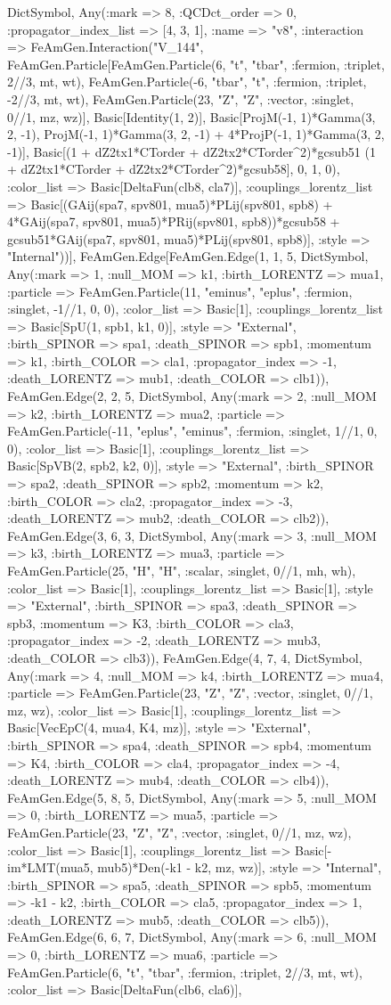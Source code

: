 \documentclass{revtex4}
\begin{document}
\begin{figure}[!htb]
\begin{center}
{Dict{Symbol, Any}(:mark => 8, :QCDct_order => 0, :propagator_index_list => [4, 3, 1], :name => "v8", :interaction => FeAmGen.Interaction("V_144", FeAmGen.Particle[FeAmGen.Particle(6, "t", "tbar", :fermion, :triplet, 2//3, mt, wt), FeAmGen.Particle(-6, "tbar", "t", :fermion, :triplet, -2//3, mt, wt), FeAmGen.Particle(23, "Z", "Z", :vector, :singlet, 0//1, mz, wz)], Basic[Identity(1, 2)], Basic[ProjM(-1, 1)*Gamma(3, 2, -1), ProjM(-1, 1)*Gamma(3, 2, -1) + 4*ProjP(-1, 1)*Gamma(3, 2, -1)], Basic[(1 + dZ2tx1*CTorder + dZ2tx2*CTorder^2)*gcsub51 (1 + dZ2tx1*CTorder + dZ2tx2*CTorder^2)*gcsub58], 0, 1, 0), :color_list => Basic[DeltaFun(clb8, cla7)], :couplings_lorentz_list => Basic[(GAij(spa7, spv801, mua5)*PLij(spv801, spb8) + 4*GAij(spa7, spv801, mua5)*PRij(spv801, spb8))*gcsub58 + gcsub51*GAij(spa7, spv801, mua5)*PLij(spv801, spb8)], :style => "Internal"))], FeAmGen.Edge[FeAmGen.Edge(1, 1, 5, Dict{Symbol, Any}(:mark => 1, :null_MOM => k1, :birth_LORENTZ => mua1, :particle => FeAmGen.Particle(11, "eminus", "eplus", :fermion, :singlet, -1//1, 0, 0), :color_list => Basic[1], :couplings_lorentz_list => Basic[SpU(1, spb1, k1, 0)], :style => "External", :birth_SPINOR => spa1, :death_SPINOR => spb1, :momentum => k1, :birth_COLOR => cla1, :propagator_index => -1, :death_LORENTZ => mub1, :death_COLOR => clb1)), FeAmGen.Edge(2, 2, 5, Dict{Symbol, Any}(:mark => 2, :null_MOM => k2, :birth_LORENTZ => mua2, :particle => FeAmGen.Particle(-11, "eplus", "eminus", :fermion, :singlet, 1//1, 0, 0), :color_list => Basic[1], :couplings_lorentz_list => Basic[SpVB(2, spb2, k2, 0)], :style => "External", :birth_SPINOR => spa2, :death_SPINOR => spb2, :momentum => k2, :birth_COLOR => cla2, :propagator_index => -3, :death_LORENTZ => mub2, :death_COLOR => clb2)), FeAmGen.Edge(3, 6, 3, Dict{Symbol, Any}(:mark => 3, :null_MOM => k3, :birth_LORENTZ => mua3, :particle => FeAmGen.Particle(25, "H", "H", :scalar, :singlet, 0//1, mh, wh), :color_list => Basic[1], :couplings_lorentz_list => Basic[1], :style => "External", :birth_SPINOR => spa3, :death_SPINOR => spb3, :momentum => K3, :birth_COLOR => cla3, :propagator_index => -2, :death_LORENTZ => mub3, :death_COLOR => clb3)), FeAmGen.Edge(4, 7, 4, Dict{Symbol, Any}(:mark => 4, :null_MOM => k4, :birth_LORENTZ => mua4, :particle => FeAmGen.Particle(23, "Z", "Z", :vector, :singlet, 0//1, mz, wz), :color_list => Basic[1], :couplings_lorentz_list => Basic[VecEpC(4, mua4, K4, mz)], :style => "External", :birth_SPINOR => spa4, :death_SPINOR => spb4, :momentum => K4, :birth_COLOR => cla4, :propagator_index => -4, :death_LORENTZ => mub4, :death_COLOR => clb4)), FeAmGen.Edge(5, 8, 5, Dict{Symbol, Any}(:mark => 5, :null_MOM => 0, :birth_LORENTZ => mua5, :particle => FeAmGen.Particle(23, "Z", "Z", :vector, :singlet, 0//1, mz, wz), :color_list => Basic[1], :couplings_lorentz_list => Basic[-im*LMT(mua5, mub5)*Den(-k1 - k2, mz, wz)], :style => "Internal", :birth_SPINOR => spa5, :death_SPINOR => spb5, :momentum => -k1 - k2, :birth_COLOR => cla5, :propagator_index => 1, :death_LORENTZ => mub5, :death_COLOR => clb5)), FeAmGen.Edge(6, 6, 7, Dict{Symbol, Any}(:mark => 6, :null_MOM => 0, :birth_LORENTZ => mua6, :particle => FeAmGen.Particle(6, "t", "tbar", :fermion, :triplet, 2//3, mt, wt), :color_list => Basic[DeltaFun(clb6, cla6)], }
\end{center}
\end{figure}
\end{document}
